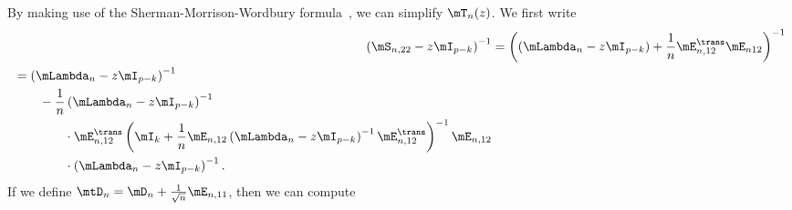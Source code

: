 By making use of the Sherman-Morrison-Wordbury formula~\cite{golub1996mc}, we can simplify $\mT_n(z)$.  We first write
\begin{align*}
    \left(
        \mS_{n,22} - z \mI_{p-k}
    \right)^{-1}
        &=
            \left(
                \left(
                    \mLambda_n - z \mI_{p-k}
                \right)
                +
                \frac{1}{n}
                \mE_{n,12}^\trans \mE_{n12}
            \right)^{-1} \\
        \begin{split}
        &=
            \left(
                \mLambda_n
                -
                z
                \mI_{p-k}
            \right)^{-1} \\
            &\qquad-
            \frac{1}{n}
            \left(
                \mLambda_n
                -
                z
                \mI_{p-k}
            \right)^{-1} \\
            &\qquad\qquad\cdot
            \mE_{n,12}^\trans
            \left(
                \mI_k
                +
                \frac{1}{n}
                \mE_{n,12}
                \left(
                    \mLambda_n
                    -
                    z
                    \mI_{p-k}
                \right)^{-1}
                \mE_{n,12}^\trans
            \right)^{-1}
            \mE_{n,12} \\
            &\qquad\qquad\cdot
            \left(
                \mLambda_n
                -
                z
                \mI_{p-k}
            \right)^{-1}.
    \end{split}
\end{align*}
If we define $\mtD_n = \mD_n + \frac{1}{\sqrt{n}} \mE_{n,11}$, then we can compute
